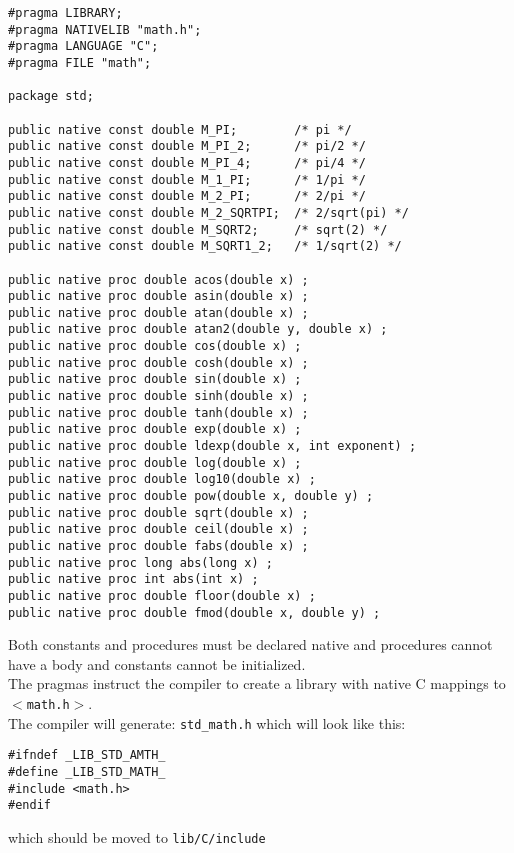 \documentclass[pdflatex,11pt,letter]{article}
\begin{document}
\begin{verbatim}
#pragma LIBRARY;
#pragma NATIVELIB "math.h";
#pragma LANGUAGE "C";
#pragma FILE "math";

package std;

public native const double M_PI;        /* pi */
public native const double M_PI_2;      /* pi/2 */
public native const double M_PI_4;      /* pi/4 */
public native const double M_1_PI;      /* 1/pi */ 
public native const double M_2_PI;      /* 2/pi */ 
public native const double M_2_SQRTPI;  /* 2/sqrt(pi) */
public native const double M_SQRT2;     /* sqrt(2) */
public native const double M_SQRT1_2;   /* 1/sqrt(2) */

public native proc double acos(double x) ;
public native proc double asin(double x) ;
public native proc double atan(double x) ;
public native proc double atan2(double y, double x) ;
public native proc double cos(double x) ;
public native proc double cosh(double x) ;
public native proc double sin(double x) ;
public native proc double sinh(double x) ;
public native proc double tanh(double x) ;
public native proc double exp(double x) ;
public native proc double ldexp(double x, int exponent) ;
public native proc double log(double x) ;
public native proc double log10(double x) ;
public native proc double pow(double x, double y) ;
public native proc double sqrt(double x) ;
public native proc double ceil(double x) ;
public native proc double fabs(double x) ;
public native proc long abs(long x) ;
public native proc int abs(int x) ;
public native proc double floor(double x) ;
public native proc double fmod(double x, double y) ;
\end{verbatim}

\noindent
Both constants and procedures must be declared native and procedures cannot have a body
and constants cannot be initialized.\\

\noindent
The pragmas instruct the compiler to create a library with native C mappings to {\tt $<$math.h$>$}.\\

\noindent
The compiler will generate: {\tt std\_math.h} which will look like this:

\begin{verbatim}
#ifndef _LIB_STD_AMTH_
#define _LIB_STD_MATH_
#include <math.h>
#endif
\end{verbatim}

\noindent
which should be moved to {\tt lib/C/include}\\
\end{document}
